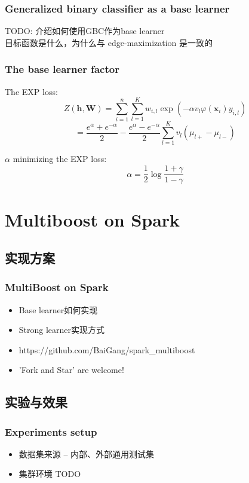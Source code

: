 \documentclass{beamer}
\begin{document}
\begin{frame}
\frametitle{Generalized binary classifier as a base learner}
TODO: 介绍如何使用GBC作为base learner \\
目标函数是什么，为什么与 edge-maximization 是一致的
\end{frame}

\begin{frame}
\frametitle{The base learner factor}
\begin{block}{The EXP loss:}
$$Z(\mathbf{h}, \mathbf{W}) = \sum_{i=1}^{n} \sum_{l=1}^{K} w_{i,l} \exp(-\alpha v_l \varphi(\mathbf{x}_i) y_{i,l}) $$
$$= \frac{e^\alpha + e^{-\alpha}}{2} - \frac{e^\alpha - e^{-\alpha}}{2} \sum_{l=1}^{K} v_l(\mu_{l+} - \mu_{l-})$$
\end{block}
\begin{block}{$\alpha$ minimizing the EXP loss:}
$$\alpha = \frac{1}{2} \log \frac{1+\gamma}{1-\gamma}$$
\end{block}
\end{frame}


\section{Multiboost on Spark}

\subsection{实现方案}

\begin{frame}
\frametitle{MultiBoost on Spark}
\begin{itemize}
\item Base learner如何实现
\item Strong learner实现方式
\item https://github.com/BaiGang/spark\_multiboost
\item 'Fork and Star' are welcome!
\end{itemize}
\end{frame}

\subsection{实验与效果}

\begin{frame}
\frametitle{Experiments setup}
\begin{itemize}
\item 数据集来源 -- 内部、外部通用测试集
\item 集群环境 TODO
\end{itemize}
\end{frame}
\end{document}
